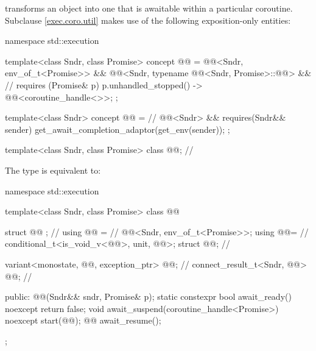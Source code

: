 \pnum
{} transforms an object into one
that is awaitable within a particular coroutine.
Subclause \ref{exec.coro.util} makes use of
the following exposition-only entities:
\begin{codeblock}
namespace std::execution {
  template<class Sndr, class Promise>
    concept @@ =
      @@<Sndr, env_of_t<Promise>> &&
      @@<Sndr,
                typename @@<Sndr, Promise>::@@> &&    // \seebelow
      requires (Promise& p) {
        { p.unhandled_stopped() } -> @@<coroutine_handle<>>;
      };

  template<class Sndr>
    concept @@ =            // \expos
      @@<Sndr> &&
      requires(Sndr&& sender) {
        get_await_completion_adaptor(get_env(sender));
      };

  template<class Sndr, class Promise>
    class @@;                                     // \expos
}
\end{codeblock}

\pnum
The type  is equivalent to:

\begin{codeblock}
namespace std::execution {
  template<class Sndr, class Promise>
  class @@ {
    struct @@ {};                                             // \expos
    using @@ =                                          // \expos
      @@<Sndr, env_of_t<Promise>>;
    using @@=                                         // \expos
      conditional_t<is_void_v<@@>, unit, @@>;
    struct @@;                                  // \expos

    variant<monostate, @@, exception_ptr> @@{};    // \expos
    connect_result_t<Sndr, @@> @@;           // \expos

  public:
    @@(Sndr&& sndr, Promise& p);
    static constexpr bool await_ready() noexcept { return false; }
    void await_suspend(coroutine_handle<Promise>) noexcept { start(@@); }
    @@ await_resume();
  };
}
\end{codeblock}

